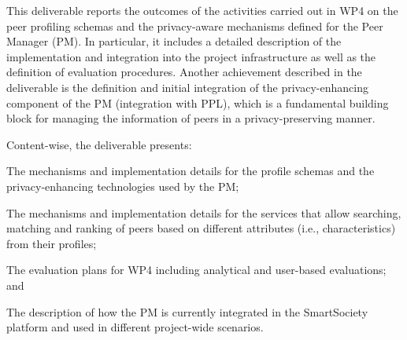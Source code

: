 
This deliverable reports the outcomes of the activities carried out in WP4 on the peer profiling schemas and the privacy-aware mechanisms defined for the Peer Manager (PM). In particular, it includes a detailed description of the implementation and integration into the project infrastructure as well as the definition of evaluation procedures. 
Another achievement described in the deliverable  %
is the definition and initial integration of the privacy-enhancing component of the PM (integration with PPL), which is a fundamental building block for managing the information of peers in a privacy-preserving manner. 

Content-wise, the deliverable presents:
\begin{inparaenum}[\itshape (i)]
\item The mechanisms and implementation details for the profile schemas and the privacy-enhancing technologies used by the PM;
\item The mechanisms and implementation details for the services that allow searching, matching and ranking of peers based on different attributes (i.e., characteristics) from their profiles;
\item The evaluation plans for WP4 including analytical and user-based evaluations; and
\item The description of how the PM is currently integrated in the SmartSociety platform and used in different project-wide scenarios.
\end{inparaenum}

